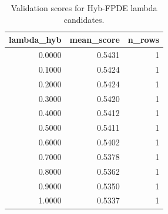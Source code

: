\begin{table}[t]
\caption{Validation scores for Hyb-FPDE lambda candidates.}
\label{tab:lambda_distribution_computed}
\centering
\begin{tabular}{rrr}
\toprule
lambda\_hyb & mean\_score & n\_rows \\
\midrule
0.0000 & 0.5431 & 1 \\
0.1000 & 0.5424 & 1 \\
0.2000 & 0.5424 & 1 \\
0.3000 & 0.5420 & 1 \\
0.4000 & 0.5412 & 1 \\
0.5000 & 0.5411 & 1 \\
0.6000 & 0.5402 & 1 \\
0.7000 & 0.5378 & 1 \\
0.8000 & 0.5362 & 1 \\
0.9000 & 0.5350 & 1 \\
1.0000 & 0.5337 & 1 \\
\bottomrule
\end{tabular}

\end{table}
